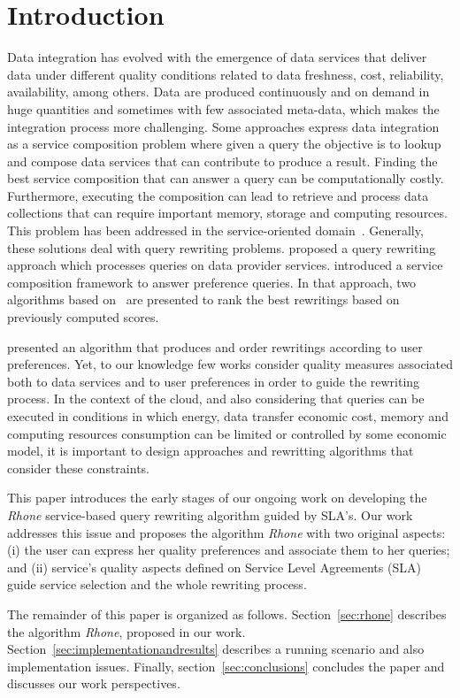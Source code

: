 \section{Introduction}
Data integration
has evolved with the emergence of data   services that deliver data under different quality conditions  related to data freshness, cost, reliability, availability, among others. Data are produced continuously and on demand in huge quantities and sometimes with few associated meta-data, which makes the integration process more challenging. Some approaches express data integration as a service composition problem where given a query the objective is to lookup and compose data services that can contribute to produce a result. Finding the best service composition that can answer a query can be computationally costly. Furthermore,  executing the composition can lead to retrieve and process data collections that can require important memory, storage and computing resources.
This problem has  been addressed in the service-oriented domain~\cite{Barhamgi2010,Benouaret2011,ba2014}.
Generally, these solutions deal with query rewriting problems.
\cite{Barhamgi2010} proposed a query rewriting approach which processes queries on data provider services. \cite{Benouaret2011} introduced a service composition framework to answer preference queries. In that approach, two algorithms based on~\cite{Barhamgi2010} are presented to rank the best rewritings based on previously computed scores.

\cite{ba2014} presented an algorithm that produces and order rewritings according to user preferences. Yet, to our knowledge few works consider quality measures associated both to data services and to user preferences in order to guide the rewriting process. In the context of the cloud, and also considering that queries can be executed in conditions in which energy, data transfer economic cost, memory and computing resources consumption can be limited or controlled by some economic model, it is important to design approaches and rewritting algorithms that consider these constraints.


This paper introduces the early stages of our
ongoing work on developing the \textit{Rhone} service-based query rewriting
algorithm guided by SLA's. Our work addresses this issue and proposes the  algorithm \textit{Rhone} with  two original aspects: (i) the user can express her
quality preferences and associate them to her queries; and (ii)  service's quality
aspects defined on Service Level Agreements (SLA) guide  service selection and  the whole rewriting process.    

The remainder of this paper is organized as follows. Section~\ref{sec:rhone}
describes the  algorithm \textit{Rhone}, proposed in our work. Section~\ref{sec:implementationandresults} describes
a running scenario and also  implementation issues.
Finally, section~\ref{sec:conclusions} concludes the paper and discusses our work perspectives.

